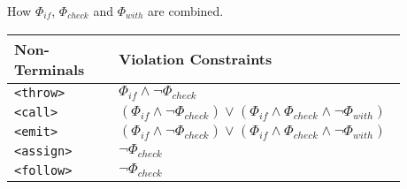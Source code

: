 \begin{table}[t]
\centering
\small
{}
{How $\Phi_{if}$, $\Phi_{check}$ and $\Phi_{with}$ are combined.}
{
}
{

\begin{tabular}{|p{0.26\linewidth}|p{0.62\linewidth}|}
\hline
 {\textbf{Non-Terminals}} & {\textbf{Violation Constraints}} \\ 


\hline
\hline

\texttt{<throw>}  & $\Phi_{if} \land \neg \Phi_{check}$ \\ \hline
\texttt{<call>}   & $(\Phi_{if} \land \neg \Phi_{check}) \lor (\Phi_{if} \land \Phi_{check} \land \neg \Phi_{with})$  \\ \hline
\texttt{<emit>}   & $(\Phi_{if} \land \neg \Phi_{check}) \lor (\Phi_{if} \land \Phi_{check} \land \neg \Phi_{with})$  \\ \hline
\texttt{<assign>}   & $\neg \Phi_{check}$  \\ \hline
\texttt{<follow>}   & $\neg \Phi_{check}$  \\ \hline
\end{tabular}
}
\vspace{-0.25in}

\end{table}